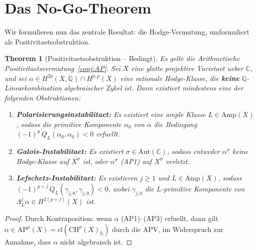 \documentclass[aps,prd,twocolumn,superscriptaddress,nofootinbib]{revtex4-2}
\newtheorem{theorem}{Theorem}[section]
\theoremstyle{definition}
\theoremstyle{remark}
\begin{document}
\section{Das No-Go-Theorem}
\label{sec:nogo}

Wir formulieren nun das zentrale Resultat: die Hodge-Vermutung, umformuliert als Positivitaetsobstruktion.

\begin{theorem}[Positivitaetsobstruktion -- Bedingt]
\label{thm:nogo}
Es gelte die Arithmetische Positivitaetsvermutung~\ref{conj:AP}. Sei $X$ eine glatte projektive Varietaet ueber $\mathbb{C}$, und sei $\alpha \in H^{2p}(X, \mathbb{Q}) \cap H^{p,p}(X)$ eine rationale Hodge-Klasse, die \textbf{keine} $\mathbb{Q}$-Linearkombination algebraischer Zykel ist. Dann existiert mindestens eine der folgenden Obstruktionen:

\begin{enumerate}
\item[\textbf{(O1)}] \textbf{Polarisierungsinstabilitaet:} Es existiert eine ample Klasse $L \in \mathrm{Amp}(X)$, sodass die primitive Komponente $\alpha_0$ von $\alpha$ die Bedingung $(-1)^p\,Q_L(\alpha_0, \alpha_0) < 0$ erfuellt.

\item[\textbf{(O2)}] \textbf{Galois-Instabilitaet:} Es existiert $\sigma \in \mathrm{Aut}(\mathbb{C})$, sodass entweder $\alpha^\sigma$ keine Hodge-Klasse auf $X^\sigma$ ist, oder $\alpha^\sigma$ (AP1) auf $X^\sigma$ verletzt.

\item[\textbf{(O3)}] \textbf{Lefschetz-Instabilitaet:} Es existieren $j \geq 1$ und $L \in \mathrm{Amp}(X)$, sodass $(-1)^{p+j}\,Q_L(\gamma_{j,0}, \gamma_{j,0}) < 0$, wobei $\gamma_{j,0}$ die $L$-primitive Komponente von $\Lambda_L^j \alpha \in H^{2(p+j)}(X)$ ist.
\end{enumerate}
\end{theorem}

\begin{proof}
Durch Kontraposition: wenn $\alpha$ (AP1)--(AP3) erfuellt, dann gilt $\alpha \in \mathrm{AP}^p(X) = \mathrm{cl}(\mathrm{CH}^p(X)_\mathbb{Q})$ durch die APV, im Widerspruch zur Annahme, dass $\alpha$ nicht algebraisch ist.
\end{proof}
\end{document}
